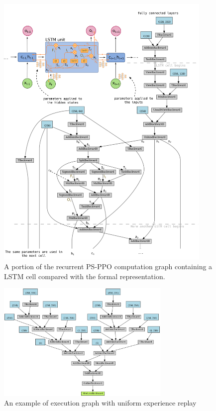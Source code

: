 \documentclass[11pt, a4paper, hidelinks]{report}
\begin{document}
\begin{figure}
\centering
\includegraphics[width=0.925\textwidth]{resources/lstm_pytorch.png}
\caption{A portion of the recurrent PS-PPO computation graph containing a LSTM cell compared with the formal representation.}
\label{fig:psppo_shared_recurrent_graph}
\end{figure}

\begin{figure}
\centering
\includegraphics[width=0.74\textwidth]{resources/d3qn_uer_graph.png}
\caption{An example of execution graph with uniform experience replay}
\label{fig:d3qn_uer_graph}
\end{figure}
\end{document}
